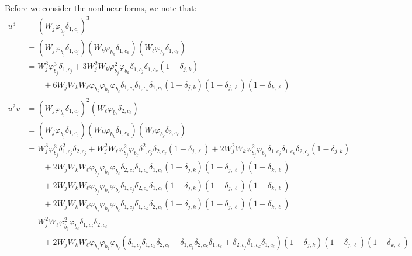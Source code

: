 \documentclass{article}
\begin{document}
Before we consider the nonlinear forms, we note that:
\begin{align*}
    u^3 & = (W_j \varphi_{b_j} \delta_{1, c_j})^3 \\
        & = (W_j \varphi_{b_j} \delta_{1, c_j}) (W_k \varphi_{b_k} \delta_{1, c_k})
            (W_\ell \varphi_{b_\ell} \delta_{1, c_\ell}) \\
        & = W_j^3 \varphi_{b_j}^3 \delta_{1, c_j}
            + 3 W_j^2 W_k \varphi_{b_j}^2 \varphi_{b_k} \delta_{1, c_j} \delta_{1, c_k} (1 - \delta_{j, k}) \\
            & \qquad + 6 W_j W_k W_\ell \varphi_{b_j} \varphi_{b_k} \varphi_{b_\ell}
                \delta_{1, c_j} \delta_{1, c_k} \delta_{1, c_\ell}
                (1 - \delta_{j, k}) (1 - \delta_{j, \ell}) (1 - \delta_{k, \ell}) \\
    u^2 v & = (W_j \varphi_{b_j} \delta_{1, c_j})^2 (W_\ell \varphi_{b_\ell} \delta_{2, c_\ell}) \\
        & = (W_j \varphi_{b_j} \delta_{1, c_j}) (W_k \varphi_{b_k} \delta_{1, c_k})
            (W_\ell \varphi_{b_\ell} \delta_{2, c_\ell}) \\
        & = W_j^3 \varphi_{b_j}^3 \delta_{1, c_j}^2 \delta_{2, c_j}
            + W_j^2 W_\ell \varphi_{b_j}^2 \varphi_{b_\ell} \delta_{1, c_j}^2 \delta_{2, c_\ell}
                (1 - \delta_{j, \ell})
            + 2 W_j^2 W_k \varphi_{b_j}^2 \varphi_{b_k} \delta_{1, c_j} \delta_{1, c_k} \delta_{2, c_j}
                (1 - \delta_{j, k}) \\
            & \qquad + 2 W_j W_k W_\ell \varphi_{b_j} \varphi_{b_k} \varphi_{b_\ell}
                \delta_{2, c_j} \delta_{1, c_k} \delta_{1, c_\ell}
                (1 - \delta_{j, k}) (1 - \delta_{j, \ell}) (1 - \delta_{k, \ell}) \\
            & \qquad + 2 W_j W_k W_\ell \varphi_{b_j} \varphi_{b_k} \varphi_{b_\ell}
                \delta_{1, c_j} \delta_{2, c_k} \delta_{1, c_\ell}
                (1 - \delta_{j, k}) (1 - \delta_{j, \ell}) (1 - \delta_{k, \ell}) \\
            & \qquad + 2 W_j W_k W_\ell \varphi_{b_j} \varphi_{b_k} \varphi_{b_\ell}
                \delta_{1, c_j} \delta_{1, c_k} \delta_{2, c_\ell}
                (1 - \delta_{j, k}) (1 - \delta_{j, \ell}) (1 - \delta_{k, \ell}) \\
        & = W_j^2 W_\ell \varphi_{b_j}^2 \varphi_{b_\ell} \delta_{1, c_j} \delta_{2, c_\ell} \\
            & \qquad + 2 W_j W_k W_\ell \varphi_{b_j} \varphi_{b_k} \varphi_{b_\ell}
                (\delta_{1, c_j} \delta_{1, c_k} \delta_{2, c_\ell}
                    + \delta_{1, c_j} \delta_{2, c_k} \delta_{1, c_\ell}
                    + \delta_{2, c_j} \delta_{1, c_k} \delta_{1, c_\ell})
                (1 - \delta_{j, k}) (1 - \delta_{j, \ell}) (1 - \delta_{k, \ell})
\end{align*}
\end{document}
